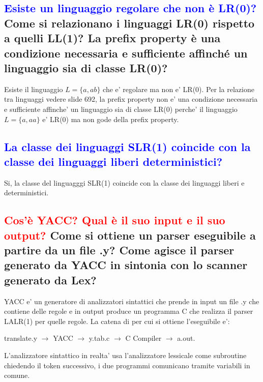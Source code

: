 \documentclass{article}
\begin{document}
    \subsection{\textcolor{blue}{Esiste un linguaggio regolare che non è LR(0)?}
        Come si relazionano i linguaggi LR(0) rispetto a quelli LL(1)?
        La prefix property è una condizione necessaria e sufficiente affinché un linguaggio sia di classe LR(0)?}
    Esiste il linguaggio $L=\{a,ab\}$ che e' regolare ma non e' LR(0). Per la
    relazione tra linguaggi vedere slide 692, la prefix property non e' una
    condizione necessaria e sufficiente affinche' un linguaggio sia di classe LR(0)
    perche' il linguaggio $L=\{a,aa\}$ e' LR(0) ma non gode della prefix property.
\subsection{\textcolor{blue}{La classe dei linguaggi SLR(1) coincide con la classe dei linguaggi liberi deterministici?}}
Si, la classe del linguagggi SLR(1) coincide con la classe dei linguaggi liberi
e deterministici.
\subsection{\textcolor{red}{Cos'è YACC? Qual è il suo input e il suo output?}
    Come si ottiene un parser eseguibile a partire da un file .y?
    Come agisce il parser generato da YACC in sintonia con lo scanner generato da Lex?}
YACC e' un generatore di analizzatori sintattici che prende in input un file .y che contiene delle regole e in output produce un programma C che realizza il parser LALR(1) per quelle regole.
La catena di per cui si ottiene l'eseguibile e':
\begin{center}
    translate.y $\to$ YACC $\to$ y.tab.c $\to$ C Compiler $\to$ a.out.
\end{center}
L'analizzatore sintattico in realta' usa l'analizzatore lessicale come subroutine chiedendo il token successivo, i due programmi comunicano tramite variabili in comune.
\end{document}
